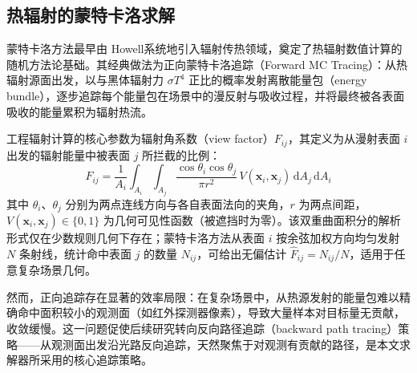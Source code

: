\subsection{热辐射的蒙特卡洛求解}

蒙特卡洛方法最早由 Howell\cite{howellMonteCarloSolution1964,howellApplicationMonteCarlo1969}系统地引入辐射传热领域，奠定了热辐射数值计算的随机方法论基础。其经典做法为正向蒙特卡洛追踪（Forward MC Tracing）：从热辐射源面出发，以与黑体辐射力 $\sigma T^4$ 正比的概率发射离散能量包（energy bundle），逐步追踪每个能量包在场景中的漫反射与吸收过程，并将最终被各表面吸收的能量累积为辐射热流。

工程辐射计算的核心参数为辐射角系数（view factor）$F_{ij}$，其定义为从漫射表面 $i$ 出发的辐射能量中被表面 $j$ 所拦截的比例：
\begin{equation}
    F_{ij} = \frac{1}{A_i} \int_{A_i} \int_{A_j}
    \frac{\cos\theta_i \cos\theta_j}{\pi r^2} \, V(\mathbf{x}_i, \mathbf{x}_j)
    \, \mathrm{d}A_j \, \mathrm{d}A_i
    \label{eq:view_factor}
\end{equation}
其中 $\theta_i$、$\theta_j$ 分别为两点连线方向与各自表面法向的夹角，$r$ 为两点间距，$V(\mathbf{x}_i, \mathbf{x}_j) \in \{0, 1\}$ 为几何可见性函数（被遮挡时为零）。该双重曲面积分的解析形式仅在少数规则几何下存在；蒙特卡洛方法从表面 $i$ 按余弦加权方向均匀发射 $N$ 条射线，统计命中表面 $j$ 的数量 $N_{ij}$，可给出无偏估计 $\hat{F}_{ij} = N_{ij}/N$，适用于任意复杂场景几何。

然而，正向追踪存在显著的效率局限：在复杂场景中，从热源发射的能量包难以精确命中面积较小的观测面（如红外探测器像素），导致大量样本对目标量无贡献，收敛缓慢。这一问题促使后续研究转向反向路径追踪（backward path tracing）策略\cite{kajiyaRenderingEquation1986}——从观测面出发沿光路反向追踪，天然聚焦于对观测有贡献的路径，是本文求解器所采用的核心追踪策略。

